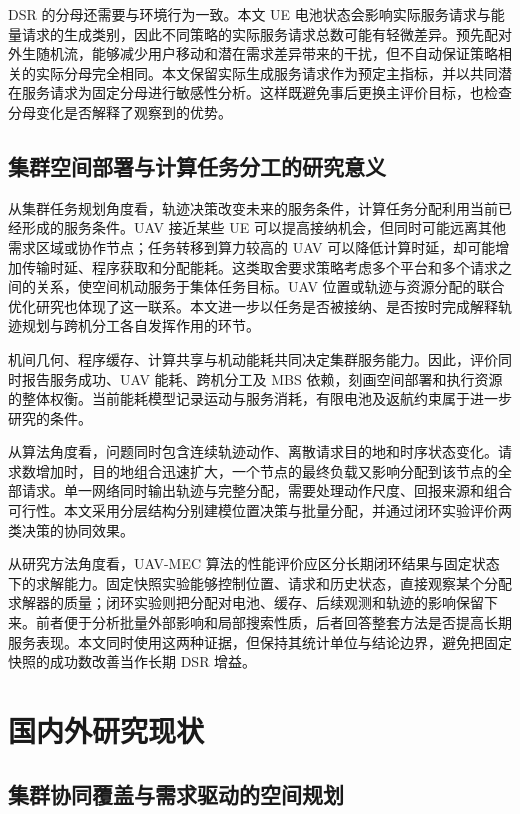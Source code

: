 DSR 的分母还需要与环境行为一致。本文 UE 电池状态会影响实际服务请求与能量请求的生成类别，因此不同策略的实际服务请求总数可能有轻微差异。预先配对外生随机流，能够减少用户移动和潜在需求差异带来的干扰，但不自动保证策略相关的实际分母完全相同。本文保留实际生成服务请求作为预定主指标，并以共同潜在服务请求为固定分母进行敏感性分析。这样既避免事后更换主评价目标，也检查分母变化是否解释了观察到的优势。

\subsection{集群空间部署与计算任务分工的研究意义}
\label{sec:ch1-significance}

从集群任务规划角度看，轨迹决策改变未来的服务条件，计算任务分配利用当前已经形成的服务条件。UAV 接近某些 UE 可以提高接纳机会，但同时可能远离其他需求区域或协作节点；任务转移到算力较高的 UAV 可以降低计算时延，却可能增加传输时延、程序获取和分配能耗。这类取舍要求策略考虑多个平台和多个请求之间的关系，使空间机动服务于集体任务目标。UAV 位置或轨迹与资源分配的联合优化研究也体现了这一联系\cite{hu2019uav,yu2020joint}。本文进一步以任务是否被接纳、是否按时完成解释轨迹规划与跨机分工各自发挥作用的环节。

机间几何、程序缓存、计算共享与机动能耗共同决定集群服务能力。因此，评价同时报告服务成功、UAV 能耗、跨机分工及 MBS 依赖，刻画空间部署和执行资源的整体权衡。当前能耗模型记录运动与服务消耗，有限电池及返航约束属于进一步研究的条件。

从算法角度看，问题同时包含连续轨迹动作、离散请求目的地和时序状态变化。请求数增加时，目的地组合迅速扩大，一个节点的最终负载又影响分配到该节点的全部请求。单一网络同时输出轨迹与完整分配，需要处理动作尺度、回报来源和组合可行性。本文采用分层结构分别建模位置决策与批量分配，并通过闭环实验评价两类决策的协同效果。

从研究方法角度看，UAV-MEC 算法的性能评价应区分长期闭环结果与固定状态下的求解能力。固定快照实验能够控制位置、请求和历史状态，直接观察某个分配求解器的质量；闭环实验则把分配对电池、缓存、后续观测和轨迹的影响保留下来。前者便于分析批量外部影响和局部搜索性质，后者回答整套方法是否提高长期服务表现。本文同时使用这两种证据，但保持其统计单位与结论边界，避免把固定快照的成功数改善当作长期 DSR 增益。

\section{国内外研究现状}
\label{sec:related_work}

\subsection{集群协同覆盖与需求驱动的空间规划}
\label{sec:ch1-swarm-coverage}

